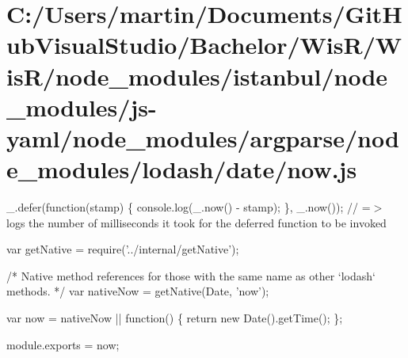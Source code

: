 \hypertarget{_c_1_2_users_2martin_2_documents_2_git_hub_visual_studio_2_bachelor_2_wis_r_2_wis_r_2node_module689ab47e26aa9eade299f6e6e3dcef08}{}\section{C\+:/\+Users/martin/\+Documents/\+Git\+Hub\+Visual\+Studio/\+Bachelor/\+Wis\+R/\+Wis\+R/node\+\_\+modules/istanbul/node\+\_\+modules/js-\/yaml/node\+\_\+modules/argparse/node\+\_\+modules/lodash/date/now.\+js}
\+\_\+.\+defer(function(stamp) \{ console.\+log(\+\_\+.\+now() -\/ stamp); \}, \+\_\+.\+now()); // =$>$ logs the number of milliseconds it took for the deferred function to be invoked


\begin{DoxyCodeInclude}
var getNative = require(\textcolor{stringliteral}{'../internal/getNative'});

\textcolor{comment}{/* Native method references for those with the same name as other `lodash` methods. */}
var nativeNow = getNative(Date, \textcolor{stringliteral}{'now'});

var now = nativeNow || \textcolor{keyword}{function}() \{
  \textcolor{keywordflow}{return} \textcolor{keyword}{new} Date().getTime();
\};

module.exports = now;
\end{DoxyCodeInclude}
 